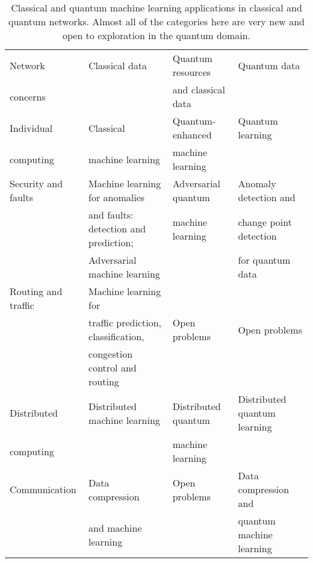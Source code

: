 \documentclass[twocolumn, aps, rmp, amsmath, amssymb, nofootinbib, superscriptaddress, longbibliography, floatfix, table-of-contents, eqsecnum]{revtex4-2}
\begin{document}
\begin{table}[h]
\centering
\begin{adjustbox}{width=\textwidth}
\begin{tabular}{lllp{5cm}}
Network  & Classical data & Quantum resources  & Quantum data \\
concerns & & and classical data & \\\hhline{|=|=|=|=|}
Individual & Classical   & Quantum-enhanced  & Quantum learning  \\ 
computing & machine learning & machine learning \\ \hline 
Security and faults & Machine learning for anomalies  & Adversarial quantum & Anomaly detection and  \\
& and faults: detection and prediction; & machine learning  & change point detection \\
& Adversarial machine learning &  & for quantum data \\ \hline 
Routing and traffic & Machine learning for \\
& traffic prediction, classification, & Open problems  & Open problems \\
& congestion control and routing\\ \hline 
Distributed  & Distributed machine learning & Distributed quantum & Distributed quantum learning \\
computing & & machine learning\\ \hline 
 Communication & Data compression & Open problems & Data compression and \\
 & and machine learning & & quantum machine learning \\ \hline 
\end{tabular}
\end{adjustbox}
\caption{\label{tab:CommTable2} Classical and quantum machine learning applications in classical and quantum networks. Almost all of the categories here are very new and open to exploration in the quantum domain.}
\end{table}


\end{document}
